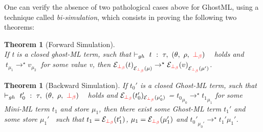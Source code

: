 \documentclass[a4paper,11pt,oneside]{article}
\theoremstyle{plain}
\newtheorem{theorem}[definition]{Theorem}
\newcommand{\rouge}[1]{\textcolor{red}{#1}}
\newcommand{\ghosttyping}[6]{\vdash_{gh}~#1~:~#2,~(#3,~#4,~\rouge{#5})~\textcolor{blue}{\boldsymbol{#6}}}
\newcommand{\evalstar}[4]{~#1_{\mu_#2} \rightarrow^{\star} #3_{\mu_#4} ~}
\newcommand{\Longdownarrow}{\rotatebox{90}{$\Longleftarrow$}}
\newcommand{\gbb}{\bot_\beta}
\newcommand{\gbbr}{\textcolor{red}{\gbb}}
\newcommand{\e}{\mathcal{E}}
\newcommand{\ebot}[1]{\e_{\gbbr}(#1)}
\begin{document}


One can verify the absence of two pathological cases above for GhostML,
using a technique called \textit{bi-simulation}, which consists in proving  
the following two theorems:

\begin{theorem}[Forward Simulation]
~\\
If t is a closed ghost-ML term, such that $\ghosttyping{t}{\tau}{\theta}{\rho}{\gbbr}{}$ ~holds and $\evalstar{t}{1}{v}{2}$ 
for some value \textit{v}, then 
${\ebot{t}}_{\ebot{\mu}} \rightarrow^\star {\ebot{v}}_{\ebot{\mu'}}$.
\end{theorem}

\begin{theorem}[Backward Simulation]
If $t_0'$ is a closed Ghost-ML term, such that $\ghosttyping{t_0'}{\tau}{\theta}{\rho}{\gbbr}{}$ ~holds and 
$\ebot{t_0'}_{\ebot{\mu_0'}}$ = ${{t_0}}_{{\mu_0}} \rightarrow^{\star} {{t_{1}}}_{\mu_1}$ 
for some Mini-ML term $t_1$ and store $\mu_1$, 
then there exist some Ghost-ML term $t_1'$ and some store $\mu_1'$~
such that $t_1 =\ebot{t_1'}$, $\mu_1 = \ebot{\mu_1'}$ and 
${t_0'}_{\mu_0'} \rightarrow^{\star} {t_1'}{\mu_1'}$.
\end{theorem}




\end{document}
